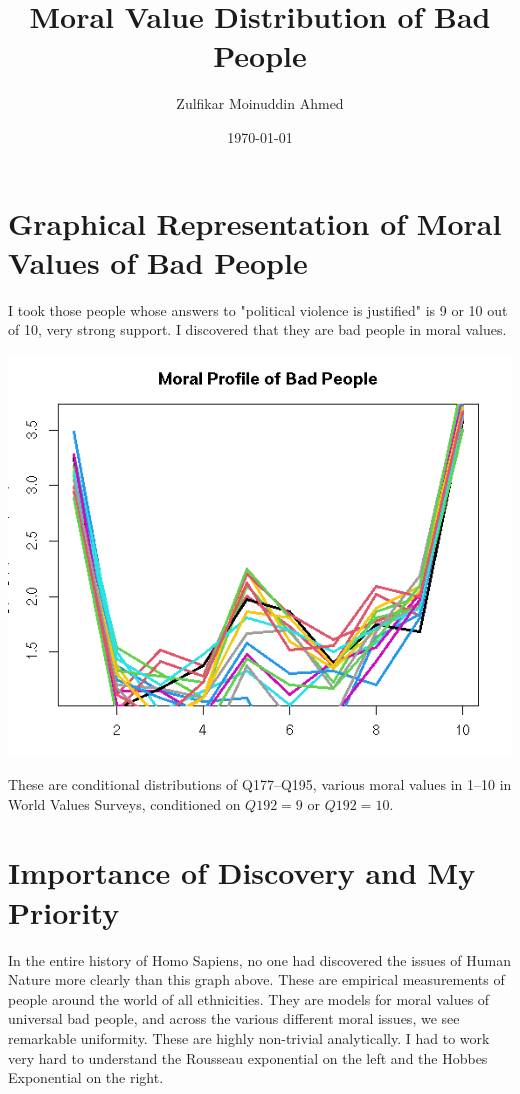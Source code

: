 \documentclass{amsart}
\title{Moral Value Distribution of Bad People}
\author{Zulfikar Moinuddin Ahmed}
\date{\today}
\begin{document}
\maketitle

\section{Graphical Representation of Moral Values of Bad People}

I took those people whose answers to "political violence is justified" is 9 or 10 out of 10, very strong support.  I discovered that they are bad people in moral values.

\includegraphics[scale=0.8]{bad.jpeg}

These are conditional distributions of Q177--Q195, various moral values in 1--10 in World Values Surveys, conditioned on $Q192=9$ or $Q192=10$.

\section{Importance of Discovery and My Priority}

In the entire history of Homo Sapiens, no one had discovered the issues of Human Nature more clearly than this graph above.  These are empirical measurements of people around the world of all ethnicities.  They are models for moral values of universal bad people, and across the various different moral issues, we see remarkable uniformity.  These are highly non-trivial analytically.  I had to work very hard to understand the Rousseau exponential on the left and the Hobbes Exponential on the right.  
\end{document}
